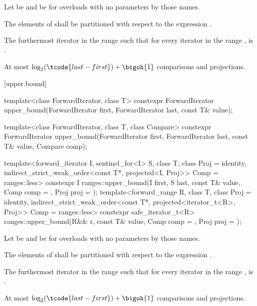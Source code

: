 \begin{itemdescr}
\pnum
Let  be  and
 be 
for overloads with no parameters by those names.

\pnum
\requires
The elements  of 
shall be partitioned with respect to the expression
.

\pnum
\returns
The furthermost iterator  in the range 
such that for every iterator  in the range ,
 is .

\pnum
\complexity
At most $\log_2(\tcode{last - first}) + \bigoh{1}$ comparisons and projections.
\end{itemdescr}

[upper.bound]{}

%
\begin{itemdecl}
template<class ForwardIterator, class T>
  constexpr ForwardIterator
    upper_bound(ForwardIterator first, ForwardIterator last,
                const T& value);

template<class ForwardIterator, class T, class Compare>
  constexpr ForwardIterator
    upper_bound(ForwardIterator first, ForwardIterator last,
                const T& value, Compare comp);

template<forward_iterator I, sentinel_for<I> S, class T, class Proj = identity,
         indirect_strict_weak_order<const T*, projected<I, Proj>> Comp = ranges::less>
  constexpr I ranges::upper_bound(I first, S last, const T& value, Comp comp = {}, Proj proj = {});
template<forward_range R, class T, class Proj = identity,
         indirect_strict_weak_order<const T*, projected<iterator_t<R>, Proj>> Comp =
           ranges::less>
  constexpr safe_iterator_t<R>
    ranges::upper_bound(R&& r, const T& value, Comp comp = {}, Proj proj = {});
\end{itemdecl}

\begin{itemdescr}
\pnum
Let  be  and
 be 
for overloads with no parameters by those names.

\pnum
\requires
The elements  of 
shall be partitioned with respect to the expression
.

\pnum
\returns
The furthermost iterator  in the range 
such that for every iterator  in the range ,
 is .

\pnum
\complexity
At most $\log_2(\tcode{last - first}) + \bigoh{1}$ comparisons and projections.
\end{itemdescr}

